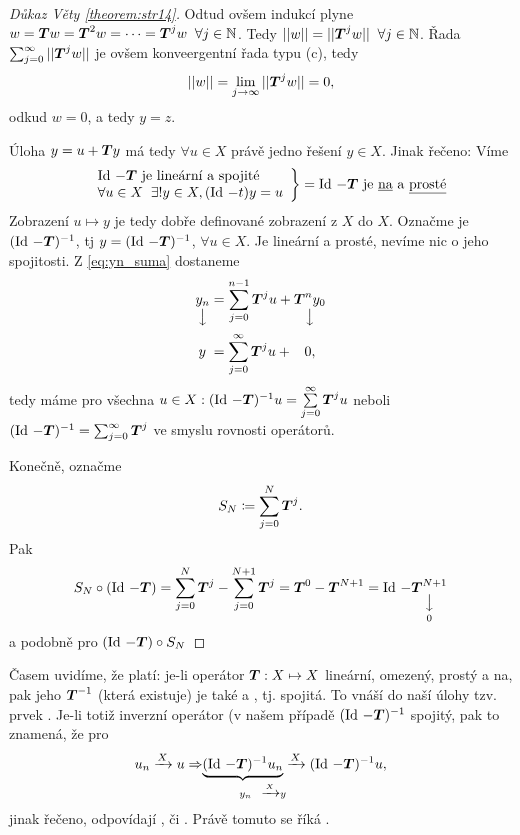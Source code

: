 \begin{proof}[Důkaz Věty \ref{theorem:str14}]
Odtud ovšem indukcí plyne $w= \boldsymbol{T} w= \boldsymbol{T} ^2w=\dots = \boldsymbol{T} ^jw \;\; \forall j\in \mathbb{N}$.  Tedy $||w||=|| \boldsymbol{T} ^jw||\;\; \forall j\in \mathbb{N}$. Řada $\sum_{j=0}^\infty|| \boldsymbol{T} ^j w||$ je ovšem konveergentní řada typu (c), tedy 
$$||w||=\lim\limits_{j\rightarrow\infty}|| \boldsymbol{T} ^jw||=0,$$
odkud $w=0$, a tedy $y=z$.

Úloha $y=u+ \boldsymbol{T} y$ má tedy $\forall u\in X$ právě jedno řešení $y\in X$. Jinak řečeno: Víme \begin{equation*}
    \begin{split}
        \left.
    \begin{array}{ll}
        &\operatorname{Id}\,- \boldsymbol{T}  \text{ je lineární a spojité} \\
        &\forall u\in X\;\;\exists ! y\in X, (\operatorname{Id}\,-t)y=u
    \end{array}
        \right \}=\operatorname{Id}\,- \boldsymbol{T}  \text{ je \underline{na} a \underline{prosté}}
    \end{split}
\end{equation*}
Zobrazení $u\mapsto y$ je tedy dobře definované zobrazení z $X$ do $X$. Označme je $(\operatorname{Id}\, - \boldsymbol{T} )^{-1}$, tj $y=(\operatorname{Id}\,- \boldsymbol{T} )^{-1}$, $\forall u\in X$. Je lineární a prosté, nevíme nic o jeho spojitosti.
Z \ref{eq:yn_suma} dostaneme 
\begin{equation*}
    \begin{split}
        \underset{\big\downarrow}{y_n} &= \sum\limits_{j=0}^{n-1} \boldsymbol{T} ^ju+\underset{\big\downarrow}{ \boldsymbol{T} ^ny_0}\\
        y\;&=\sum\limits_{j=0}^\infty  \boldsymbol{T} ^ju+\;\;\;0,
    \end{split}
\end{equation*}
tedy máme pro všechna $u\in X: (\operatorname{Id}\,- \boldsymbol{T} )^{-1}u=\sum\limits_{j=0}^\infty  \boldsymbol{T} ^ju$ neboli $(\operatorname{Id}\,- \boldsymbol{T} )^{-1}=\sum_{j=0}^\infty  \boldsymbol{T} ^j$ ve smyslu rovnosti operátorů.

Konečně, označme
$$S_N\coloneqq \sum\limits_{j=0}^N  \boldsymbol{T} ^j.$$
Pak 
$$S_N\circ(\operatorname{Id}\,- \boldsymbol{T} )=\sum\limits_{j=0}^N  \boldsymbol{T} ^j-\sum\limits_{j=0}^{N+1}  \boldsymbol{T} ^j =  \boldsymbol{T} ^0- \boldsymbol{T} ^{N+1}=\operatorname{Id}\,-\underset{0}{\underset{\big\downarrow}{ \boldsymbol{T} ^{N+1}}}$$
a podobně pro $(\operatorname{Id}\,- \boldsymbol{T} )\circ S_N$
\end{proof}

\Poznamka
Časem uvidíme, že platí: je-li operátor $ \boldsymbol{T} :X\mapsto X$ lineární, omezený, prostý a na, pak jeho  $ \boldsymbol{T} ^{-1}$ (která existuje) je také  a , tj. spojitá. To vnáší do naší úlohy tzv. prvek . Je-li totiž inverzní operátor (v našem případě $(\operatorname{Id}\,- \boldsymbol{T} )^{-1}$ spojitý, pak to znamená, že pro 
$$u_n\xrightarrow{X}u\Rightarrow \underset{\quad\; y_n\;\;\;\xrightarrow{X}y}{\underbrace{(\operatorname{Id}\,- \boldsymbol{T} )^{-1}u_n}\xrightarrow{X}}(\operatorname{Id}\,- \boldsymbol{T} )^{-1}u,$$
jinak řečeno,  odpovídají , či . Právě tomuto se říká .

